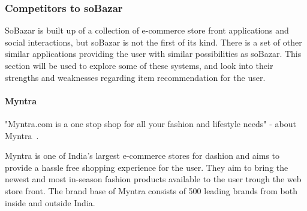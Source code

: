 
\subsubsection{Competitors to soBazar}
SoBazar is built up of a collection of e-commerce store front applications and social interactions, but soBazar is not the first of its kind.
There is a set of other similar applications providing the user with similar possibilities as soBazar.
This section will be used to explore some of these systems, and look into their strengths and weaknesses regarding item recommendation for the user.

\paragraph{Myntra} %
\label{par:myntra}
    "Myntra.com is a one stop shop for all your fashion and lifestyle needs" - about Myntra~\cite{myntra}.

    Myntra is one of India's largest e-commerce stores for dashion and aims to  provide a hassle free shopping experience for the user.
    They aim to bring the newest and most in-season fashion products available to the user trough the web store front.
    The brand base of Myntra consists of 500 leading brands from both inside and outside India.

